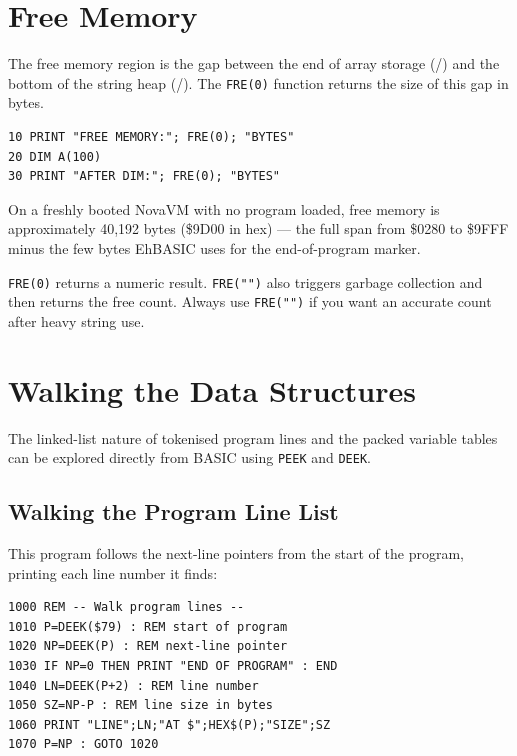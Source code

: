 \section{Free Memory}

The free memory region is the gap between the end of array storage
(/) and the bottom of the string heap
(/).  The \texttt{FRE(0)} function returns the size of
this gap in bytes.

\begin{lstlisting}
10 PRINT "FREE MEMORY:"; FRE(0); "BYTES"
20 DIM A(100)
30 PRINT "AFTER DIM:"; FRE(0); "BYTES"
\end{lstlisting}

On a freshly booted NovaVM with no program loaded, free memory is
approximately 40,192 bytes (\$9D00 in hex) --- the full span from \$0280 to
\$9FFF minus the few bytes EhBASIC uses for the end-of-program marker.

\begin{notebox}
\texttt{FRE(0)} returns a numeric result.  \texttt{FRE("")} also triggers
garbage collection and then returns the free count.  Always use
\texttt{FRE("")} if you want an accurate count after heavy string use.
\end{notebox}

\section{Walking the Data Structures}

The linked-list nature of tokenised program lines and the packed variable
tables can be explored directly from BASIC using \texttt{PEEK} and
\texttt{DEEK}.

\subsection{Walking the Program Line List}

This program follows the next-line pointers from the start of the program,
printing each line number it finds:

\begin{lstlisting}
1000 REM -- Walk program lines --
1010 P=DEEK($79) : REM start of program
1020 NP=DEEK(P) : REM next-line pointer
1030 IF NP=0 THEN PRINT "END OF PROGRAM" : END
1040 LN=DEEK(P+2) : REM line number
1050 SZ=NP-P : REM line size in bytes
1060 PRINT "LINE";LN;"AT $";HEX$(P);"SIZE";SZ
1070 P=NP : GOTO 1020
\end{lstlisting}

